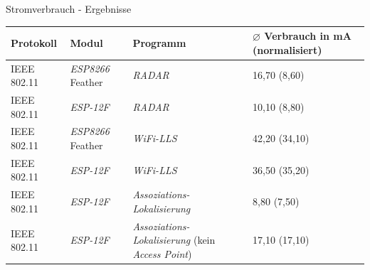 \documentclass[18pt]{beamer}
\begin{document}
\begin{frame}{Stromverbrauch - Ergebnisse}
	\begin{tabular}{l|l|p{3.1cm}|R{2.1cm}}
		Protokoll & Modul & Programm  & $\varnothing$ Verbrauch in mA (normalisiert)\\
		\hline
		IEEE 802.11 & \emph{ESP8266} Feather & \emph{RADAR} & 16,70 (8,60)\\
		IEEE 802.11 & \emph{ESP-12F} & \emph{RADAR} & 10,10 (8,80) \\
		\hline
		IEEE 802.11 & \emph{ESP8266} Feather & \emph{WiFi-LLS} & 42,20 (34,10)\\
		IEEE 802.11 & \emph{ESP-12F} & \emph{WiFi-LLS} & 36,50 (35,20)\\
		\hline
		IEEE 802.11 & \emph{ESP-12F} & \emph{Assoziations-Lokalisierung} & 8,80 (7,50)\\
		IEEE 802.11 & \emph{ESP-12F} & \emph{Assoziations-Lokalisierung} (kein \emph{Access Point}) & 17,10 (17,10)\\
	\end{tabular}
\end{frame}
\end{document}
